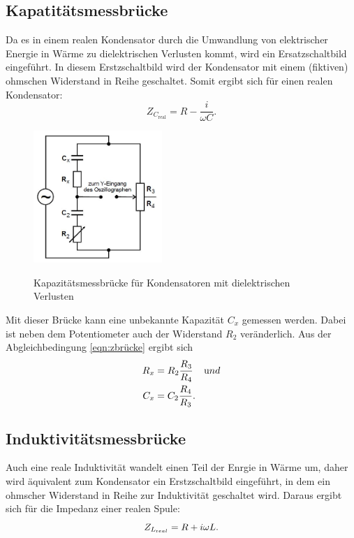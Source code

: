 \subsection{Kapatitätsmessbrücke}
Da es in einem realen Kondensator durch die Umwandlung von elektrischer Energie in
Wärme zu dielektrischen Verlusten kommt, wird ein Ersatzschaltbild eingeführt.
In diesem Erstzschaltbild wird der Kondensator mit einem (fiktiven) ohmschen Widerstand
in Reihe geschaltet. Somit ergibt sich für einen realen Kondensator:
\begin{equation*}
  Z_{C_{\text{real}}}=R-\frac{i}{\omega C}.
  \label{eqn:zcreal}
\end{equation*}
\begin{figure}[H]
  \centering
  \includegraphics[height=5cm]{kapazitat.JPG}
  \caption{Kapazitätsmessbrücke für Kondensatoren mit dielektrischen Verlusten}
  \label{fig:kapazitat}
  \cite{skript}
\end{figure}
Mit dieser Brücke kann eine unbekannte Kapazität $C_{x}$ gemessen werden.
Dabei ist neben dem Potentiometer auch der Widerstand
$R_{2}$ veränderlich.
Aus der Abgleichbedingung \ref{eqn:zbrücke} ergibt sich
\begin{align}
  R_{x} &=R_{2}\frac{R_{3}}{R_{4}} \;\;\;\;\text und \\
  C_{x} &=C_{2}\frac{R_{4}}{R_{3}}.
  \label{eqn:cx}
\end{align}

\subsection{Induktivitätsmessbrücke}
 Auch eine reale Induktivität wandelt einen Teil der Enrgie in Wärme um, daher wird äquivalent
 zum Kondensator ein Erstzschaltbild eingeführt, in dem ein ohmscher Widerstand in Reihe
 zur Induktivität geschaltet wird.
 Daraus ergibt sich für die Impedanz einer realen Spule:
 \begin{equation}
   Z_{L_{\text real}}= R + i\omega L.
   \label{zlreal}
 \end{equation}

